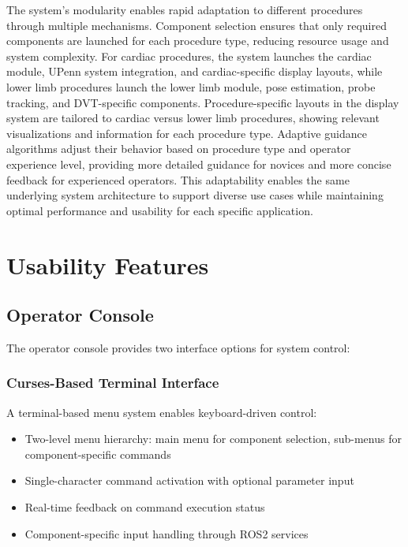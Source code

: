 \documentclass[12pt,a4paper]{article}
\begin{document}
The system's modularity enables rapid adaptation to different procedures through multiple mechanisms. Component selection ensures that only required components are launched for each procedure type, reducing resource usage and system complexity. For cardiac procedures, the system launches the cardiac module, UPenn system integration, and cardiac-specific display layouts, while lower limb procedures launch the lower limb module, pose estimation, probe tracking, and DVT-specific components. Procedure-specific layouts in the display system are tailored to cardiac versus lower limb procedures, showing relevant visualizations and information for each procedure type. Adaptive guidance algorithms adjust their behavior based on procedure type and operator experience level, providing more detailed guidance for novices and more concise feedback for experienced operators. This adaptability enables the same underlying system architecture to support diverse use cases while maintaining optimal performance and usability for each specific application.

\section{Usability Features}

\subsection{Operator Console}

The operator console provides two interface options for system control:

\subsubsection{Curses-Based Terminal Interface}

A terminal-based menu system enables keyboard-driven control:

\begin{itemize}
    \item Two-level menu hierarchy: main menu for component selection, sub-menus for component-specific commands
    \item Single-character command activation with optional parameter input
    \item Real-time feedback on command execution status
    \item Component-specific input handling through ROS2 services
\end{itemize}
\end{document}
